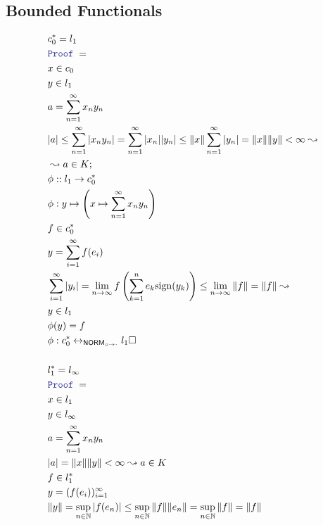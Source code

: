 \documentclass[12pt]{scrartcl}
\newcommand{\LOGIC}[1]{\textcolor{Blue}{\mathtt{#1}}}
\renewcommand{\.}{\; . \;}
\newcommand{\Page}[1]{\begin{align*} #1 \end{align*} \newpage   }
\newcommand{\Nat}{\mathbb{N} }
\newcommand{\ToBij}{\leftrightarrow}
\newcommand{\Proof}{\LOGIC{Proof} \; }
\newcommand{\NORMI}{\mathsf{NORM}_{\circ \to \cdot}} %
\begin{document}
 \subsection{Bounded Functionals}
 \Page{
 &  c_0^* = l_1   \\
 & \Proof = \\
 &  x \in c_0 \\
 &  y \in l_1 \\
 &  a  =  \sum^\infty_{n = 1} x_n y_n\\ 
 & |a| \le \sum^\infty_{n = 1} | x_n y_n | =   \sum^\infty_{n = 1} | x_n ||y_n |
 \le   \| x \| \sum^\infty_{n = 1} | y_n | = \| x \| \| y \| < \infty \leadsto \\
  & \leadsto a \in K ; \\
 & \phi :: l_1 \to c_0^* \\
 & \phi : y \mapsto \left(  x \mapsto \sum^\infty_{n = 1} x_n y_n  \right)  \\
 & f \in c^*_0 \\
 & y = \sum^\infty_{i = 1} f(e_i)  \\ 
 &  \sum^\infty_{i = 1}  | y_i |    =  
 \lim_{n \to \infty} f \left( \sum^n_{k = 1} e_k \mathrm{sign}(y_k)  \right) \le
 \lim_{n \to \infty}  \| f \| =  \| f \| \leadsto                            \\
 &  y \in l_1  \\   
 & \phi(y) = f \\ 
 & \phi : c_0^* \ToBij_{\NORMI} l_1 \square \\   
 \\ 
 &  l_1^* = l_\infty \\    
 & \Proof = \\
 & x \in  l_1 \\
 & y \in l_\infty \\
 & a =  \sum^\infty_{n = 1} x_n y_n \\
 & |a|  =  \| x \| \| y \| < \infty \leadsto a \in K \\  
 &  f \in l_1^*    \\
 &  y  = ( f(e_i) )^\infty_{i = 1} \\
 &  \| y \|  = \sup_{ n \in \Nat} | f(e_n) | \le \sup_{ n \in \Nat} \| f \|  \| e_n  \| =
    \sup_{ n \in \Nat} \| f \| = \| f \|
  }
\end{document}
